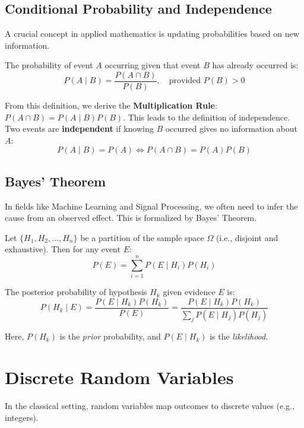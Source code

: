 \subsection{Conditional Probability and Independence}

A crucial concept in applied mathematics is updating probabilities based on new information.

\begin{definition}
The probability of event $A$ occurring given that event $B$ has already occurred is:
\[ P(A \mid B) = \frac{P(A \cap B)}{P(B)}, \quad \text{provided } P(B) > 0 \]
\end{definition}

From this definition, we derive the \textbf{Multiplication Rule}: $P(A \cap B) = P(A \mid B)P(B)$. This leads to the definition of independence. Two events are \textbf{independent} if knowing $B$ occurred gives no information about $A$:
\[ P(A \mid B) = P(A) \iff P(A \cap B) = P(A)P(B) \]

\subsection{Bayes' Theorem}

In fields like Machine Learning and Signal Processing, we often need to infer the cause from an observed effect. This is formalized by Bayes' Theorem.

\begin{theorem}
Let $\{H_1, H_2, \dots, H_n\}$ be a partition of the sample space $\Omega$ (i.e., disjoint and exhaustive). Then for any event $E$:
\[ P(E) = \sum_{i=1}^n P(E \mid H_i)P(H_i) \]
\end{theorem}

\begin{theorem}
The posterior probability of hypothesis $H_k$ given evidence $E$ is:
\[ P(H_k \mid E) = \frac{P(E \mid H_k)P(H_k)}{P(E)} = \frac{P(E \mid H_k)P(H_k)}{\sum_{j} P(E \mid H_j)P(H_j)} \]
\end{theorem}
Here, $P(H_k)$ is the \textit{prior} probability, and $P(E \mid H_k)$ is the \textit{likelihood}.

\section{Discrete Random Variables}

In the classical setting, random variables map outcomes to discrete values (e.g., integers).


